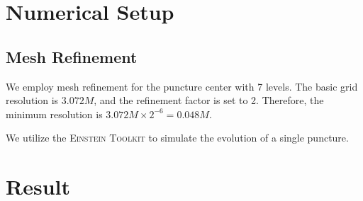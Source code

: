 \documentclass[%
 reprint,
 amsmath,amssymb,
 aps,
 prd,
]{revtex4-2}
\begin{document}
\section{Numerical Setup}

\subsection{Mesh Refinement}

We employ mesh refinement \cite{CarpetCode:web} for the puncture center with 7 levels. The basic grid resolution is $3.072M$, and the refinement factor is set to 2. Therefore, the minimum resolution is $3.072M\times 2^{-6} = 0.048M$.

We utilize the \textsc{Einstein Toolkit} \cite{EinsteinToolkit:2023_05} to simulate the evolution of a single puncture.


%
%
%
%

\section{Result}
\end{document}
